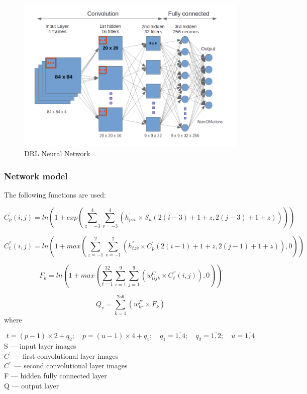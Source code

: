 \documentclass[a4paper,oneside,dvipsnames]{article}
\begin{document}
\begin{figure}[h]
    \centering
    \includegraphics[scale=0.50]{ss_nn_schm.png}
    \caption{DRL Neural Network}
    \label{fig:neural_net}
\end{figure}

\subsubsection[Network model]{Network model}
The following functions are used:

\begin{equation}
C_{p}^{'}(i,j) = ln(1 + exp(\sum_{z=-3}^{4}\sum_{v=-3}^{4}(h_{pzv}^{'} \times S_{u}(2(i-3)+1+z,2(j-3)+1+z))))
\end{equation}

\begin{equation}
C_{t}^{''}(i,j) = ln(1 + max(\sum_{z=-1}^{2}\sum_{v=-1}^{2}(h_{tzv}^{''} \times C_{p}^{'}(2(i-1)+1+z,2(j-1)+1+z)),0))
\end{equation}

\begin{equation}
F_{k} = ln(1 + max(\sum_{t=1}^{32}\sum_{i=1}^{9}\sum_{j=1}^{9}(w_{tijk}^{C} \times C_{t}^{''}(i,j)),0))
\end{equation}

\begin{equation}
Q_{r} = \sum_{k=1}^{256}(w_{kr}^{F} \times F_{k})
\end{equation}
where

\begin{equation}
t = (p-1) \times 2 + q_{2}; \quad
p = (u-1) \times 4 + q_{1}; \quad
q_{1} = \overline{1,4}; \quad
q_{2} = \overline{1,2}; \quad 
u = \overline{1,4}
\end{equation}
S --- input layer images \\
$C^{'}$ --- first convolutional layer images \\
$C^{''}$ --- second convolutional layer images \\
F --- hidden fully connected layer \\
Q --- output layer
\end{document}
